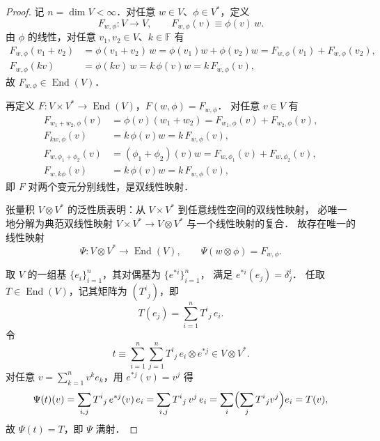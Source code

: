 \begin{proof}
	
		记 $n=\dim V<\infty$．对任意 $w\in V$、$\phi\in V^*$，定义
	\begin{equation*}
		F_{w,\phi}:V\to V,\qquad
		F_{w,\phi}(v)\equiv\phi(v)\,w .
	\end{equation*}
	由 $\phi$ 的线性，对任意 $v_1,v_2\in V$、$k\in\mathbb{F}$ 有
	\begin{align*}
		F_{w,\phi}(v_1+v_2)
		&=\phi(v_1+v_2)\,w
		=\phi(v_1)w+\phi(v_2)w
		=F_{w,\phi}(v_1)+F_{w,\phi}(v_2), \\
		F_{w,\phi}(kv)
		&=\phi(kv)\,w
		=k\,\phi(v)w
		=k\,F_{w,\phi}(v),
	\end{align*}
	故 $F_{w,\phi}\in\operatorname{End}(V)$．
	
	再定义 $F:V\times V^*\to\operatorname{End}(V)$，$F(w,\phi)=F_{w,\phi}$．
	对任意 $v\in V$ 有
	\begin{align*}
		F_{w_1+w_2,\phi}(v)
		&=\phi(v)(w_1+w_2)
		=F_{w_1,\phi}(v)+F_{w_2,\phi}(v), \\
		F_{kw,\phi}(v)
		&=k\,\phi(v)w
		=k\,F_{w,\phi}(v), \\
		F_{w,\phi_1+\phi_2}(v)
		&=(\phi_1+\phi_2)(v)w
		=F_{w,\phi_1}(v)+F_{w,\phi_2}(v), \\
		F_{w,k\phi}(v)
		&=k\,\phi(v)w
		=k\,F_{w,\phi}(v),
	\end{align*}
	即 $F$ 对两个变元分别线性，是双线性映射．
	
	
	张量积 $V\otimes V^*$ 的泛性质表明：从 $V\times V^*$ 到任意线性空间的双线性映射，
	必唯一地分解为典范双线性映射 $V\times V^*\to V\otimes V^*$ 与一个线性映射的复合．
	故存在唯一的线性映射
	\begin{equation*}
		\Psi:V\otimes V^*\to\operatorname{End}(V),
		\qquad \Psi(w\otimes\phi)=F_{w,\phi}.
	\end{equation*}
	
	
	取 $V$ 的一组基 $\{e_i\}_{i=1}^{n}$，其对偶基为 $\{e^{*i}\}_{i=1}^{n}$，
	满足 $e^{*i}(e_j)=\delta^i_j$．
	任取 $T\in\operatorname{End}(V)$，记其矩阵为 $(T^i{}_{j})$，即
	\begin{equation*}
		T(e_j)=\sum_{i=1}^{n}T^i{}_j\,e_i .
	\end{equation*}
	令
	\begin{equation*}
		t\equiv\sum_{i=1}^{n}\sum_{j=1}^{n}
		T^i{}_j\,e_i\otimes e^{*j}\in V\otimes V^* .
	\end{equation*}
	对任意 $v=\sum_{k=1}^{n}v^k e_k$，用 $e^{*j}(v)=v^j$ 得
	\begin{equation*}
		\Psi(t)(v)
		=\sum_{i,j}T^i{}_j\,e^{*j}(v)\,e_i
		=\sum_{i,j}T^i{}_j\,v^j\,e_i
		=\sum_{i}\Bigl(\sum_{j}T^i{}_j v^j\Bigr)e_i
		=T(v),
	\end{equation*}
	故 $\Psi(t)=T$，即 $\Psi$ 满射．
	

\end{proof}
